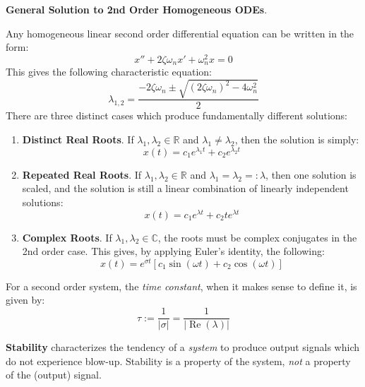 \begin{framed}
    \textbf{General Solution to 2nd Order Homogeneous ODEs}.

    Any homogeneous linear second order differential equation can be written in the form: \[x'' + 2\zeta \omega_nx' + \omega_n^2 x = 0\] This gives the following characteristic equation: \[\lambda_{1,2} = \frac{-2\zeta\omega_n \pm \sqrt{(2\zeta\omega_n)^2 - 4\omega_n^2}}{2}\] There are three distinct cases which produce fundamentally different solutions:
    \begin{enumerate}
        \item[] \textbf{Distinct Real Roots}. If $\lambda_1,\lambda_2\in\mathbb{R}$ and $\lambda_1\neq \lambda_2$, then the solution is simply: \[x(t) = c_1e^{\lambda_1 t} + c_2e^{\lambda_2 t}\]
        \item[] \textbf{Repeated Real Roots}. If $\lambda_1,\lambda_2\in\mathbb{R}$ and $\lambda_1=\lambda_2=:\lambda$, then one solution is scaled, and the solution is still a linear combination of linearly independent solutions: \[x(t) = c_1e^{\lambda t} + c_2 te^{\lambda t}\]
        \item[] \textbf{Complex Roots}. If $\lambda_1,\lambda_2\in\mathbb{C}$, the roots must be complex conjugates in the 2nd order case. This gives, by applying Euler's identity, the following: \[x(t) = e^{\sigma t} \left[c_1 \sin(\omega t) + c_2\cos(\omega t)\right]\]
    \end{enumerate}
    For a second order system, the \textit{time constant}, when it makes sense to define it, is given by: \[\tau := \frac{1}{|\sigma |} = \frac{1}{|\operatorname{Re}(\lambda)|}\]
\end{framed}

\textbf{Stability} characterizes the tendency of a \textit{system} to produce output signals which do not experience blow-up. Stability is a property of the system, \textit{not} a property of the (output) signal.

